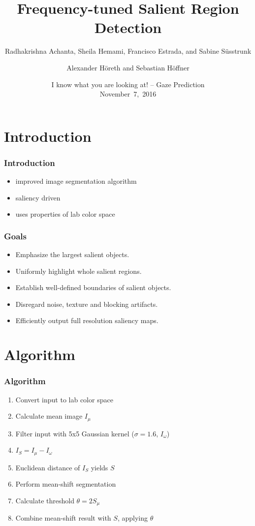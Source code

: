 \documentclass{beamer}
\title{Frequency-tuned Salient Region Detection}
\subtitle{Radhakrishna Achanta, Sheila Hemami, Francisco Estrada, and Sabine Süsstrunk}
\author{Alexander Höreth and Sebastian Höffner}
\institute{Institute of Cognitive Science\\University of Osnabrück}
\date[Nov~7,~2016]{I know what you are looking at! -- Gaze Prediction\\November~7,~2016}
\begin{document}
\frame{\titlepage}


\section{Introduction}

\begin{frame}
    \frametitle{Introduction}
    \begin{itemize}
        \item improved image segmentation algorithm
        \item saliency driven
        \item uses properties of lab color space
    \end{itemize}
\end{frame}

\begin{frame}
    \frametitle{Goals}
    \begin{itemize}
        \item Emphasize the largest salient objects.
        \item Uniformly highlight whole salient regions.
        \item Establish well-defined boundaries of salient objects.
        \item Disregard noise, texture and blocking artifacts.
        \item Efficiently output full resolution saliency maps.
    \end{itemize}
\end{frame}


\section{Algorithm}

\begin{frame}
    \frametitle{Algorithm}
    \begin{enumerate}
        \item Convert input to lab color space
        \item Calculate mean image $I_{\mu}$
        \item Filter input with 5x5 Gaussian kernel ($\sigma = 1.6$, $I_{\omega}$)
        \item $I_S = I_{\mu} - I_{\omega}$
        \item Euclidean distance of $I_S$ yields $S$
        \item Perform mean-shift segmentation
        \item Calculate threshold $\theta = 2S_{\mu}$
        \item Combine mean-shift result with $S$, applying $\theta$
    \end{enumerate}
\end{frame}
\end{document}

